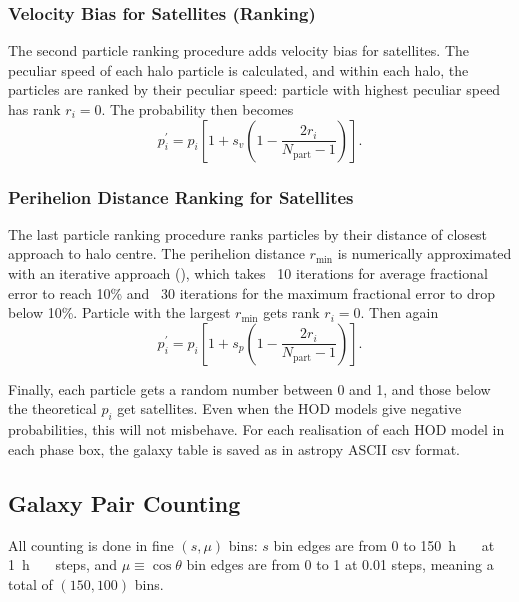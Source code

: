 \documentclass[10pt,A4]{aastex62}
\begin{document}
		\subsubsection{Velocity Bias for Satellites (Ranking)}
			
			The second particle ranking procedure adds velocity bias for satellites. The peculiar speed of each halo particle is calculated, and within each halo, the particles are ranked by their peculiar speed: particle with highest peculiar speed has rank $r_i=0$. The probability then becomes
			\begin{equation}
				p_i ^\prime = p_i \left[ 1 + s_v (1 - \frac{2 r_i}{N_\text{part} - 1}) \right] .
			\end{equation}
			
		\subsubsection{Perihelion Distance Ranking for Satellites}
			
			The last particle ranking procedure ranks particles by their distance of closest approach to halo centre. The perihelion distance $r_\text{min}$ is numerically approximated with an iterative approach (\cite{yuan2018}), which takes ~10 iterations for average fractional error to reach 10\% and ~30 iterations for the maximum fractional error to drop below 10\%. Particle with the largest $r_\text{min}$ gets rank $r_i = 0$. Then again
			\begin{equation}
				p_i ^\prime = p_i \left[ 1 + s_p (1 - \frac{2 r_i}{N_\text{part} - 1}) \right] .
			\end{equation}
			
		Finally, each particle gets a random number between 0 and 1, and those below the theoretical $p_i$ get satellites. Even when the HOD models give negative probabilities, this will not misbehave. For each realisation of each HOD model in each phase box, the galaxy table is saved as in astropy ASCII csv format.

	\subsection{Galaxy Pair Counting}
	
		All counting is done in fine $(s, \mu)$ bins: $s$ bin edges are from 0 to \SI{150}{h  \mega\parsec} at \SI{1}{h  \mega\parsec} steps, and $\mu \equiv \cos\theta$ bin edges are from 0 to 1 at 0.01 steps, meaning a total of $(150, 100)$ bins.
		
\end{document}
